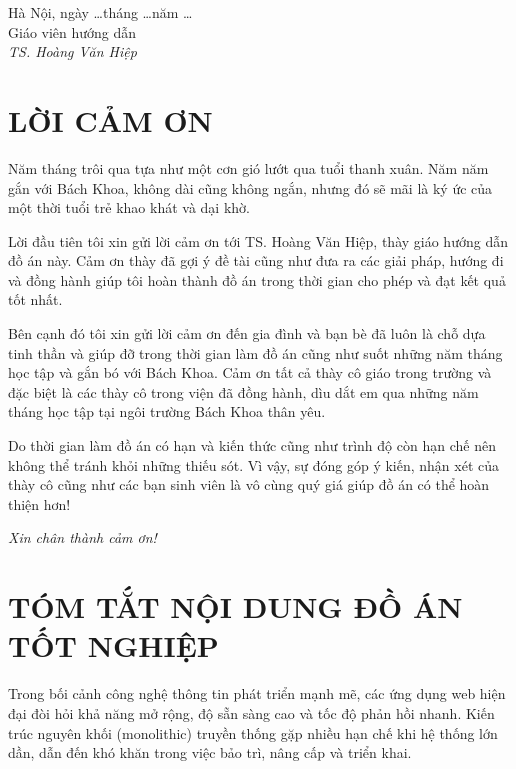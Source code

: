 \documentclass[12pt]{extreport}
\begin{document}
\begin{flushright}
    Hà Nội, ngày \ldots tháng \ldots năm \ldots\\[0.5cm]
    Giáo viên hướng dẫn\\[1cm]
    \textit{TS. Hoàng Văn Hiệp}
\end{flushright}

\cleardoublepage

\chapter*{LỜI CẢM ƠN}

Năm tháng trôi qua tựa như một cơn gió lướt qua tuổi thanh xuân. Năm năm gắn với Bách Khoa, không dài cũng không ngắn, nhưng đó sẽ mãi là ký ức của một thời tuổi trẻ khao khát và dại khờ.

Lời đầu tiên tôi xin gửi lời cảm ơn tới TS. Hoàng Văn Hiệp, thày giáo hướng dẫn đồ án này. Cảm ơn thày đã gợi ý đề tài cũng như đưa ra các giải pháp, hướng đi và đồng hành giúp tôi hoàn thành đồ án trong thời gian cho phép và đạt kết quả tốt nhất.

Bên cạnh đó tôi xin gửi lời cảm ơn đến gia đình và bạn bè đã luôn là chỗ dựa tinh thần và giúp đỡ trong thời gian làm đồ án cũng như suốt những năm tháng học tập và gắn bó với Bách Khoa. Cảm ơn tất cả thày cô giáo trong trường và đặc biệt là các thày cô trong viện đã đồng hành, dìu dắt em qua những năm tháng học tập tại ngôi trường Bách Khoa thân yêu.

Do thời gian làm đồ án có hạn và kiến thức cũng như trình độ còn hạn chế nên không thể tránh khỏi những thiếu sót. Vì vậy, sự đóng góp ý kiến, nhận xét của thày cô cũng như các bạn sinh viên là vô cùng quý giá giúp đồ án có thể hoàn thiện hơn!

\begin{flushright}
    \textit{Xin chân thành cảm ơn!}
\end{flushright}

\cleardoublepage

\chapter*{TÓM TẮT NỘI DUNG ĐỒ ÁN TỐT NGHIỆP}

Trong bối cảnh công nghệ thông tin phát triển mạnh mẽ, các ứng dụng web hiện đại đòi hỏi khả năng mở rộng, độ sẵn sàng cao và tốc độ phản hồi nhanh. Kiến trúc nguyên khối (monolithic) truyền thống gặp nhiều hạn chế khi hệ thống lớn dần, dẫn đến khó khăn trong việc bảo trì, nâng cấp và triển khai.
\end{document}
